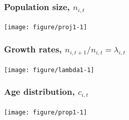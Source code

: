 \documentclass[color=usenames,dvipsnames]{beamer}\usepackage[]{graphicx}\usepackage[]{color}
\begin{document}
\begin{frame}[fragile]
  \frametitle{Population size, $n_{i,t}$}

\vspace{-0.9cm}
\begin{center}
  \texttt{[image: figure/proj1-1]}
\end{center}
\end{frame}




\begin{frame}[fragile]
  \frametitle{Growth rates, $n_{i,t+1}/n_{i,t} = \lambda_{i,t}$}

\vspace{-0.9cm}
\begin{center}
  \texttt{[image: figure/lambda1-1]}
\end{center}
\end{frame}




\begin{frame}[fragile]
  \frametitle{Age distribution, $c_{i,t}$}

\vspace{-0.9cm}
\begin{center}
  \texttt{[image: figure/prop1-1]}
\end{center}
\end{frame}
\end{document}
